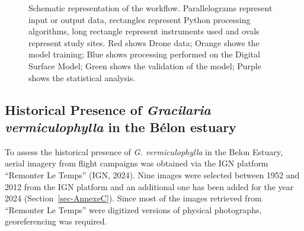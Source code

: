 \documentclass[
  letterpaper,
  DIV=11,
  numbers=noendperiod]{scrartcl}
\begin{document}
\label{cell-fig-Workflow}
\begin{figure}[H]


\caption{\label{fig-Workflow}Schematic representation of the workflow.
Parallelograms represent input or output data, rectangles represent
Python processing algorithms, long rectangle represent instruments used
and ovals represent study sites. Red shows Drone data; Orange shows the
model training; Blue shows processing performed on the Digital Surface
Model; Green shows the validation of the model; Purple shows the
statistical analysis.}

\end{figure}%

\subsection{\texorpdfstring{Historical Presence of \emph{Gracilaria
vermiculophylla} in the Bélon
estuary}{Historical Presence of Gracilaria vermiculophylla in the Bélon estuary}}\label{historical-presence-of-gracilaria-vermiculophylla-in-the-buxe9lon-estuary}

To assess the historical presence of \emph{G. vermiculophylla} in the
Belon Estuary, aerial imagery from flight campaigns was obtained via the
IGN platform ``Remonter Le Temps'' (IGN, 2024). Nine images were
selected between 1952 and 2012 from the IGN platform and an additional
one has been added for the year 2024 (Section~\ref{sec-AnnexeC}). Since
most of the images retrieved from ``Remonter Le Temps'' were digitized
versions of physical photographs, georeferencing was required.
\end{document}
